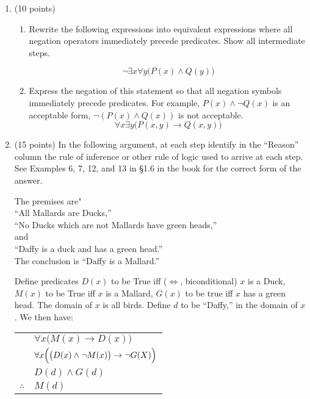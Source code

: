 \documentclass[letterpaper,12pt]{article}
\theoremstyle{plain}
\theoremstyle{definition}
\theoremstyle{remark}
\providecommand{\land}{\ensuremath{\wedge}}
\begin{document}
\begin{enumerate}
\item (10 points) 
  \begin{enumerate}
  \item Rewrite the following expressions into equivalent expressions where all negation operators immediately precede predicates. Show all intermediate steps.

    \[\lnot \exists x \forall y \bigl( P(x) \land Q(y) \bigr)\]
    



 \item Express the negation of this statement so that all negation symbols immediately precede predicates. For example, $P(x) \land \lnot Q(x)$ is an acceptable form, $\lnot(P(x) \land Q(x))$ is not acceptable.
       \[\forall x \exists y \bigl(P(x,y) \to Q(x,y) \bigr)\] 
     \end{enumerate}





\item (15 points)
  In the following argument, at each step identify in the ``Reason'' column the rule of inference or other rule of logic used to arrive at each step.
  See Examples 6, 7, 12, and 13 in \S 1.6 in the book for the correct form of the answer.

  The premises are" \\
  ``All Mallards are Ducks,'' \\
  ``No Ducks which are not Mallards have green heads,'' \\
  and \\
  ``Daffy is a duck and has a green head.''\\
  The conclusion is ``Daffy is a Mallard.''

  Define predicates $D(x)$ to be True iff ($\iff$, biconditional) $x$ is a Duck, $M(x)$ to be True iff $x$ is a Mallard, $G(x)$ to be true iff $x$ has a green head.
  The domain of $x$ is all birds.
  Define $d$ to be ``Daffy,'' in the domain of $x$.
  We then have:

  \begin{tabular}{cl}
    & $\forall x \bigl( M(x) \to D(x) \bigr)$\\
    & $\forall x \Bigl( \bigl( D(x) \land \lnot M(x) \bigr) \to \lnot G(X) \Bigr)$\\
    & $D(d) \land G(d)$\\
    \hline
    $\therefore$ & $M(d)$
  \end{tabular}


\end{enumerate}
\end{document}
